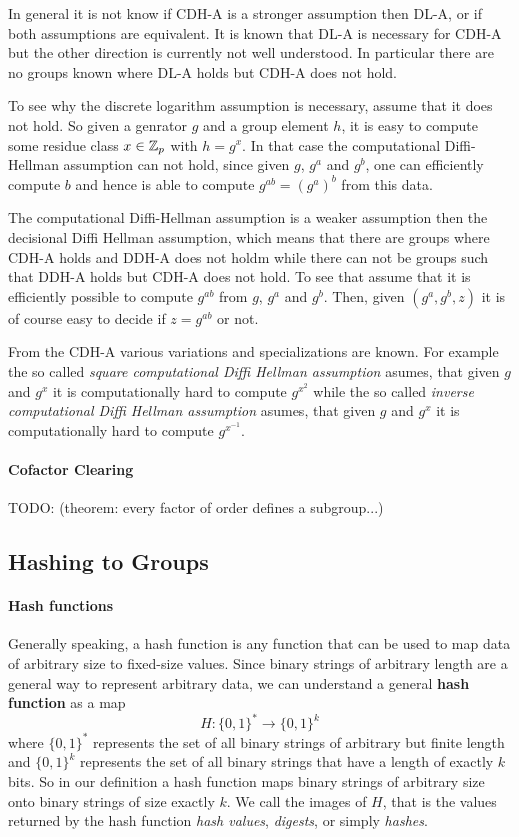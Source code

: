In general it is not know if CDH-A is a stronger assumption then DL-A, or if both assumptions are equivalent. It is known that DL-A is necessary for CDH-A but the other direction is currently not well understood. In particular there are no groups known where DL-A holds but CDH-A does not hold.

To see why the discrete logarithm assumption is necessary, assume that it does not hold. So given a genrator $g$ and a group element $h$, it is easy to compute some residue class $x\in\mathbb{Z}_p$ with $h=g^x$. In that case the computational Diffi-Hellman assumption can not hold, since given $g$, $g^a$ and $g^b$, one can efficiently compute $b$ and hence is able to compute $g^{ab}=(g^a)^b$ from this data.

The computational Diffi-Hellman assumption is a weaker assumption then the decisional Diffi Hellman assumption, which means that there are groups where CDH-A holds and DDH-A does not holdm while there can not be groups such that DDH-A holds but CDH-A does not hold. To see that assume that it is efficiently possible to compute $g^{ab}$ from $g$, $g^a$ and $g^b$. Then, given $(g^a,g^b,z)$ it is of course easy to decide if $z=g^{ab}$ or not. 

From the CDH-A various variations and specializations are known. For example the so called \textit{square computational Diffi Hellman assumption} asumes, that given $g$ and $g^x$ it is computationally hard to compute $g^{x^2}$ while the so called \textit{inverse computational Diffi Hellman assumption} asumes, that given $g$ and $g^x$ it is computationally hard to compute $g^{x^{-1}}$. 

\paragraph{Cofactor Clearing}
TODO: (theorem: every factor of order defines a subgroup...)
\subsection{Hashing to Groups}
\paragraph{Hash functions} Generally speaking, a hash function is any function that can be used to map data of arbitrary size to fixed-size values. Since binary strings of arbitrary length are a general way to represent arbitrary data, we can understand a general \textbf{hash function} as a map 
\begin{equation}
H: \{0,1\}^* \to \{0,1\}^k
\end{equation}
where $\{0,1\}^*$ represents the set of all binary strings of arbitrary but finite length and $\{0,1\}^k$ represents the set of all binary strings that have a length of exactly $k$ bits. So in our definition a hash function maps binary strings of arbitrary size onto binary strings of size exactly $k$. We call the images of $H$, that is the values returned by the hash function \textit{hash values}, \textit{digests}, or simply \textit{hashes}.

